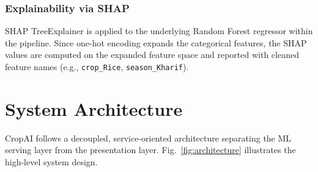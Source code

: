 \documentclass[conference]{IEEEtran}
\begin{document}
\subsubsection{Explainability via SHAP}
SHAP TreeExplainer is applied to the underlying Random Forest regressor within the pipeline. Since one-hot encoding expands the categorical features, the SHAP values are computed on the expanded feature space and reported with cleaned feature names (e.g., \texttt{crop\_Rice}, \texttt{season\_Kharif}).


\section{System Architecture}
\label{sec:architecture}

CropAI follows a decoupled, service-oriented architecture separating the ML serving layer from the presentation layer. Fig.~\ref{fig:architecture} illustrates the high-level system design.
\end{document}
